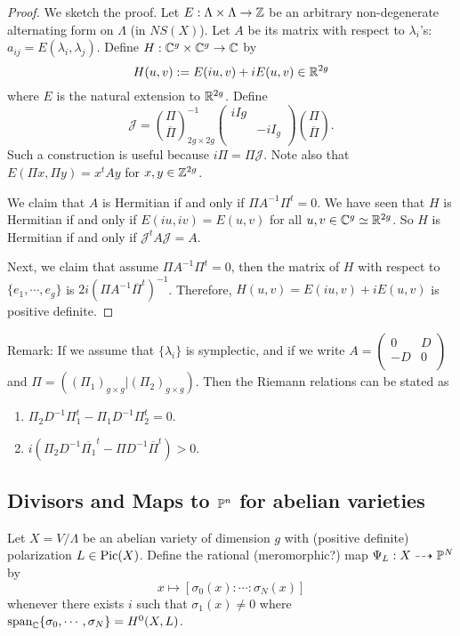 \begin{proof}
We sketch the proof. Let $E:\Lambda\times \Lambda \to {\mathbb Z}$ be an arbitrary non-degenerate alternating form on $\Lambda$ (in $NS(X)$). Let $A$ be its matrix with respect to $\lambda_i$'s: $a_{ij}=E(\lambda_i,\lambda_j)$. Define $H:{\mathbb C}^g\times {\mathbb C}^g\to {\mathbb C}$ by 
\[
H(u,v):=E(iu,v)+iE(u,v) \in {\mathbb R}^{2g}
\]
where $E$ is the natural extension to ${\mathbb R}^{2g}$. Define 
\[
\mathcal{J}=\binom{\Pi}{\overline{\Pi}}^{-1}_{2g\times 2g} \left(
\begin{array}{cc}
iIg & \ \\
\ & -i I_g\\
\end{array}
\right)\binom{\Pi}{\overline{\Pi}}.
\]
Such a construction is useful because $i\Pi = \Pi \mathcal{J}$. Note also that $E(\Pi x,\Pi y)=x^t A y$ for $x,y\in {\mathbb Z}^{2g}$. 

We claim that $A$ is Hermitian if and only if $\Pi A^{-1} \Pi^t=0$. We have seen that $H$ is Hermitian if and only if $E(iu,iv)=E(u,v)$ for all $u,v\in {\mathbb C}^{g}\simeq {\mathbb R}^{2g}$. So $H$ is Hermitian if and only if $\mathcal{J}^t A \mathcal{J}=A$.

Next, we claim that assume $\Pi A^{-1} \Pi^t=0$, then the matrix of $H$ with respect to $\{e_1,\cdots,e_g\}$ is $2i(\Pi A^{-1} \overline{\Pi}^t)^{-1}$. Therefore, $H(u,v)=E(iu,v)+i E(u,v)$ is positive definite.
\end{proof}

Remark: If we assume that $\{\lambda_i\}$ is symplectic, and if we write $A=\left(
\begin{array}{cc}
0 & D\\
-D & 0 \\
\end{array}
\right)$
and $\Pi = ((\Pi_1)_{g\times g} | (\Pi_2)_{g\times g})$. Then the Riemann relations can be stated as 
\begin{enumerate}
\item $\Pi_2 D^{-1} \Pi_1^t-\Pi_1 D^{-1}\Pi_2^t=0$.
\item $i(\Pi_2 D^{-1}\overline{\Pi_1}^t-\Pi D^{-1}\overline{\Pi}^t)>0$. 
\end{enumerate}

\subsection{Divisors and Maps to ${\mathbb P}^n$ for abelian varieties}
Let $X=V/\Lambda$ be an abelian variety of dimension $g$ with (positive definite) polarization $L\in \operatorname{Pic}(X)$. Define the rational (meromorphic?) map $\Psi_L: X\dashrightarrow {\mathbb P}^N$ by
$$x\mapsto [\sigma_0(x):\cdots:\sigma_N(x)]$$
whenever there exists $i$ such that $\sigma_1(x)\not= 0$ where $\text{span}_{\mathbb C}\{\sigma_0,\cdots,\sigma_N\}=H^0(X,L)$. 

